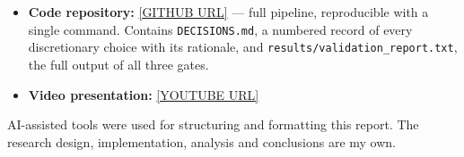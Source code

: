 \documentclass{article}
\begin{document}
\begin{itemize}[noitemsep,topsep=2pt]
    \item \textbf{Code repository:} \url{[GITHUB URL]} --- full pipeline,
      reproducible with a single command. Contains \texttt{DECISIONS.md}, a
      numbered record of every discretionary choice with its rationale, and
      \texttt{results/validation\_report.txt}, the full output of all three gates.
    \item \textbf{Video presentation:} \url{[YOUTUBE URL]}
\end{itemize}

AI-assisted tools were used for structuring and formatting this report. The
research design, implementation, analysis and conclusions are my own.

\vfill\pagebreak
{\fontsize{8}{9}\selectfont


}
\end{document}
